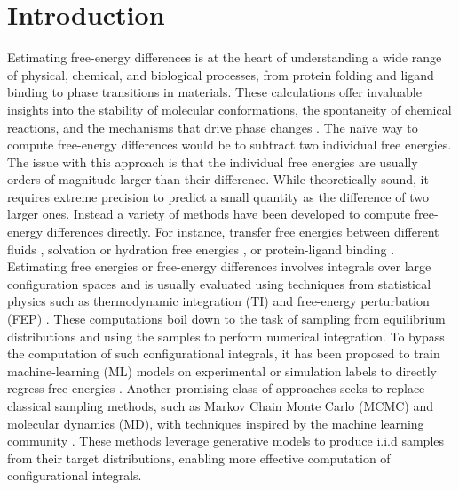 \documentclass[%
onecolumn,
superscriptaddress,
nofootinbib,
amsmath,amssymb,
table
]{revtex4-2}
\begin{document}
\section{Introduction}
Estimating free-energy differences is at the heart of understanding a wide range of physical, chemical, and biological processes, from protein folding and ligand binding to phase transitions in materials. These calculations offer invaluable insights into the stability of molecular conformations, the spontaneity of chemical reactions, and the mechanisms that drive phase changes \citep{beveridge1989free, gao2006mechanisms, mobley2017predicting, agarwal2021free}. The na\"ive way to compute free-energy differences would be to subtract two individual free energies. The issue with this approach is that the individual free energies are usually orders-of-magnitude larger than their difference. While theoretically sound, it requires extreme precision to predict a small quantity as the difference of two larger ones. Instead a variety of methods have been developed to compute free-energy differences directly. For instance, transfer free energies between different fluids  \cite{martin1997predicting, leroy2009interfacial}, solvation or hydration free energies \cite{mezei1987finite, straatsma1988free, helms1997free, martins2014prediction}, or protein-ligand binding \cite{brandsdal2003free, perozzo2004thermodynamics, deng2009computations, de2011free}. Estimating free energies or free-energy differences involves integrals over large configuration spaces and is usually evaluated using techniques from statistical physics such as thermodynamic integration (TI) and free-energy perturbation (FEP) \cite{mey2020best}. These computations  boil down to the task of sampling from equilibrium distributions and using the samples to perform numerical integration. To bypass the computation of such configurational integrals, it has been proposed to train machine-learning (ML) models on experimental or simulation labels to directly regress free energies \cite{riniker2017molecular, scheen2020hybrid, bennett2020predicting, rauer2020hydration, weinreich2021machine}. Another promising class of approaches seeks to replace classical sampling methods, such as Markov Chain Monte Carlo (MCMC) and molecular dynamics (MD), with techniques inspired by the machine learning community \citep{noe2019boltzmann, wirnsberger2020targeted, invernizzi2022skipping}. These methods leverage  generative models to produce i.i.d samples from their target distributions, enabling more effective computation of configurational integrals. 
\end{document}
